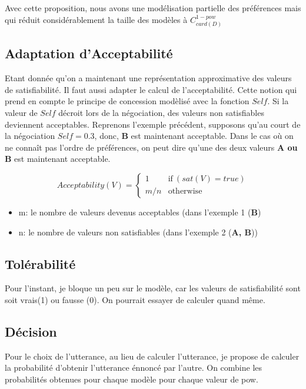 \documentclass{llncs}
\begin{document}
	Avec cette proposition, nous avons une mod\'elisation partielle des pr\'ef\'erences mais qui r\'eduit consid\'erablement la taille des mod\`eles à $C_{card(D)}^{1-pow} $  
	
	\subsection{Adaptation d'Acceptabilit\'e}
	Etant donn\'ee qu'on a maintenant une repr\'esentation approximative des valeurs de satisfiabilit\'e. Il faut aussi adapter le calcul de l'acceptabilit\'e.
	Cette notion qui prend en compte le principe de concession mod\`elis\'e avec la fonction $Self$. Si la valeur de $Self$ d\'ecroit lors de la n\'egociation, des valeurs non satisfiables deviennent acceptables.
	Reprenons l'exemple pr\'ec\'edent, supposons qu'au court de la n\'egociation $Self = 0.3$, donc, \textbf{B} est maintenant acceptable. 
	Dans le cas o\`u on ne conna\^it pas l'ordre de pr\'ef\'erences, on peut dire qu'une des deux valeurs \textbf{A ou B} est maintenant acceptable.
	
	\begin{equation}
	Acceptability(V) =  \left\{\begin{array}{ll}
	1 & \mathrm{if\ } (sat(V) = true)\\
	m/n & \mathrm{otherwise}
	\end{array}\right.
	\end{equation}
	\begin{itemize}
		\item m: le nombre de valeurs devenus acceptables (dans l'exemple 1 (\textbf{B})
		\item n: le nombre de valeurs non satisfiables (dans l'exemple 2 (\textbf{A, B}))
	\end{itemize}
	
	\subsection{Tol\'erabilit\'e}
	Pour l'instant, je bloque un peu sur le mod\`ele, car les valeurs de satisfiabilit\'e sont soit vrais(1) ou fausse (0). 
	On pourrait essayer de calculer quand même.
	
	\subsection{D\'ecision}
	Pour le choix de l'utterance, au lieu de calculer l'utterance, je propose de calculer la probabilit\'e d'obtenir l'utterance \'ennonc\'e par l'autre. 
	On combine les probabilit\'es obtenues pour chaque mod\`ele pour chaque valeur de pow. 
	
\end{document}

